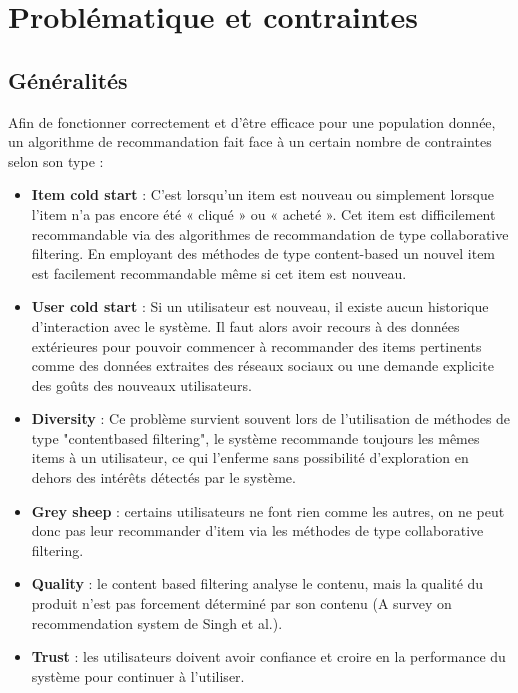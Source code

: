 \chapter{Problématique et contraintes}



\section{Généralités}
Afin de fonctionner correctement et d'être efficace pour une population donnée, un algorithme de recommandation fait face à un certain nombre de contraintes selon son type : 


\vspace{5mm}


\begin{itemize}
    \item \textbf{Item cold start} : C'est lorsqu'un item est nouveau ou simplement lorsque l’item n’a pas encore été « cliqué » ou « acheté ». Cet item est difficilement recommandable via des algorithmes de recommandation de type collaborative filtering. En employant des méthodes de type content-based un nouvel item est facilement recommandable même si cet item est nouveau.
    \vspace{2mm}
    \item \textbf{User cold start} : Si un utilisateur est nouveau, il existe aucun historique d’interaction avec le système. Il faut alors avoir recours à des données extérieures pour pouvoir commencer à recommander des items pertinents comme des données extraites des réseaux sociaux ou une demande explicite des goûts des nouveaux utilisateurs.  
    \vspace{2mm}
    \item \textbf{Diversity} : Ce problème survient souvent lors de l’utilisation de méthodes de type "contentbased filtering", le système recommande toujours les mêmes items à un utilisateur, ce qui l’enferme sans possibilité d’exploration en dehors des intérêts détectés par le système.
    \vspace{2mm}
    \item \textbf{Grey sheep} : certains utilisateurs ne font rien comme les autres, on ne peut donc pas leur recommander d’item via les méthodes de type collaborative filtering. 
    \vspace{2mm}
    \item \textbf{Quality} : le content based filtering analyse le contenu, mais la qualité du produit n'est pas forcement déterminé par son contenu (A survey on recommendation system de Singh et al.).
    \vspace{2mm}
    \item \textbf{Trust} : les utilisateurs doivent avoir confiance et croire en la performance du système pour continuer à l’utiliser.
    
\end{itemize}

